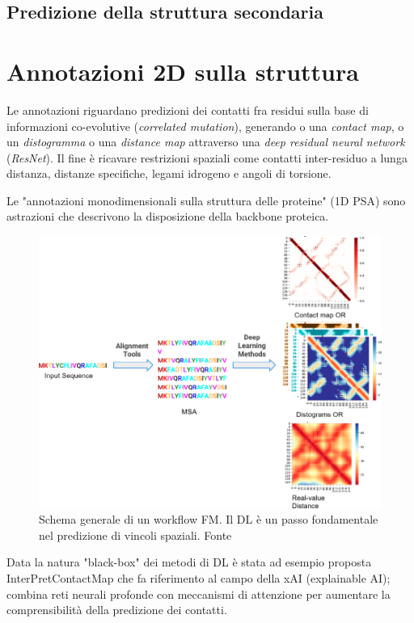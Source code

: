 \subsection{Predizione della struttura secondaria}

\section{Annotazioni 2D sulla struttura}

Le annotazioni riguardano predizioni dei contatti fra residui sulla base di informazioni co-evolutive (\textit{correlated mutation}), generando o una \textit{contact map}, o un \textit{distogramma} o una \textit{distance map} attraverso una \textit{deep residual neural network} (\textit{ResNet}). Il fine è ricavare restrizioni spaziali come contatti inter-residuo a lunga distanza, distanze specifiche, legami idrogeno e angoli di torsione.

Le "annotazioni monodimensionali sulla struttura delle proteine" (1D PSA) sono astrazioni che descrivono la disposizione della backbone proteica.

\begin{figure}[!htb]
	\centering
	\includegraphics[scale=0.6]{images/FM-template.png}
	\caption{Schema generale di un workflow FM. Il DL è un passo fondamentale nel predizione di vincoli spaziali. Fonte\cite{pakhrin2021deep}}
	\label{fig:fm-template-dl}
\end{figure}


Data la natura "black-box" dei metodi di DL è stata ad esempio proposta InterPretContactMap che fa riferimento al campo della xAI (explainable AI); combina reti neurali profonde con meccanismi di attenzione per aumentare la comprensibilità della predizione dei contatti.

